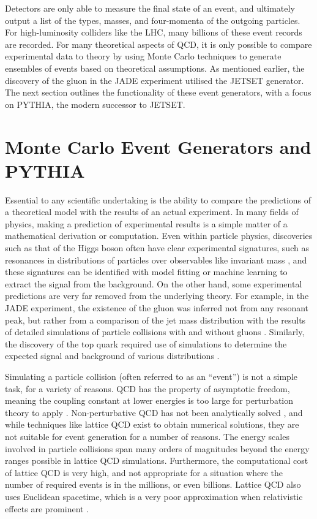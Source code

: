 \documentclass[12pt,a4paper]{report}
\begin{document}
Detectors are only able to measure the final state of an event, and ultimately output a list of the types, masses, and four-momenta of the outgoing particles. For high-luminosity colliders like the LHC, many billions of these event records are recorded. For many theoretical aspects of QCD, it is only possible to compare experimental data to theory by using Monte Carlo techniques to generate ensembles of events based on theoretical assumptions. As mentioned earlier, the discovery of the gluon in the JADE experiment utilised the JETSET generator. The next section outlines the functionality of these event generators, with a focus on PYTHIA, the modern successor to JETSET.

\section{Monte Carlo Event Generators and PYTHIA}
Essential to any scientific undertaking is the ability to compare the predictions of a theoretical model with the results of an actual experiment. In many fields of physics, making a prediction of experimental results is a simple matter of a mathematical derivation or computation. Even within particle physics, discoveries such as that of the Higgs boson often have clear experimental signatures, such as resonances in distributions of particles over observables like invariant mass \cite{ATLAS:2012yve,CMS:2012qbp}, and these signatures can be identified with model fitting or machine learning to extract the signal from the background. On the other hand, some experimental predictions are very far removed from the underlying theory. For example, in the JADE experiment, the existence of the gluon was inferred not from any resonant peak, but rather from a comparison of the jet mass distribution with the results of detailed simulations of particle collisions with and without gluons \cite{JADE:1979rke}. Similarly, the discovery of the top quark required use of simulations to determine the expected signal and background of various distributions \cite{CDF:1995wbb,D0:1995jca}.

Simulating a particle collision (often referred to as an ``event'') is not a simple task, for a variety of reasons. QCD has the property of asymptotic freedom, meaning the coupling constant at lower energies is too large for perturbation theory to apply \cite{Gross:1973ju,Politzer:1974fr}. Non-perturbative QCD has not been analytically solved \cite{ParticleDataGroup:2024cfk}, and while techniques like lattice QCD exist to obtain numerical solutions, they are not suitable for event generation for a number of reasons. The energy scales involved in particle collisions span many orders of magnitudes beyond the energy ranges possible in lattice QCD simulations. Furthermore, the computational cost of lattice QCD is very high, and not appropriate for a situation where the number of required events is in the millions, or even billions. Lattice QCD also uses Euclidean spacetime, which is a very poor approximation when relativistic effects are prominent \cite{Salam:2010zt}.
\end{document}
